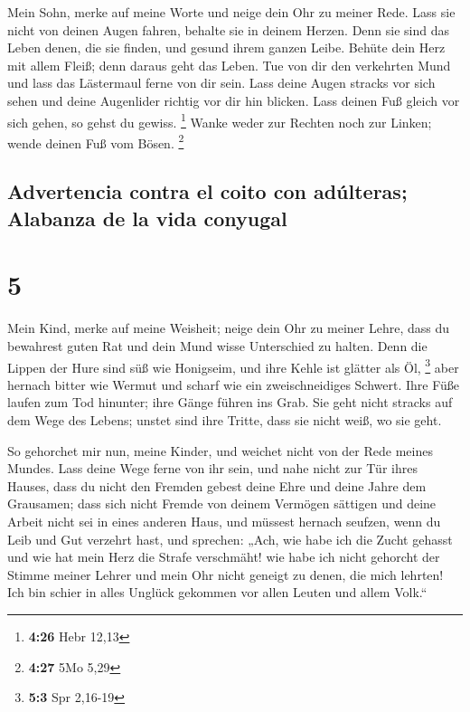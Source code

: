  Mein Sohn, merke auf meine Worte und neige dein Ohr zu
meiner Rede.  Lass sie nicht von deinen Augen fahren,
behalte sie in deinem Herzen.  Denn sie sind das Leben
denen, die sie finden, und gesund ihrem ganzen Leibe. 
Behüte dein Herz mit allem Fleiß; denn daraus geht das Leben.
 Tue von dir den verkehrten Mund und lass das Lästermaul
ferne von dir sein.  Lass deine Augen stracks vor sich
sehen und deine Augenlider richtig vor dir hin blicken. 
Lass deinen Fuß gleich vor sich gehen, so gehst du gewiss. \footnote{\textbf{4:26}
  Hebr 12,13}  Wanke weder zur Rechten noch zur Linken;
wende deinen Fuß vom Bösen. \footnote{\textbf{4:27} 5Mo 5,29}

\hypertarget{advertencia-contra-el-coito-con-aduxfalteras-alabanza-de-la-vida-conyugal}{%
\subsection{Advertencia contra el coito con adúlteras; Alabanza de la
vida
conyugal}\label{advertencia-contra-el-coito-con-aduxfalteras-alabanza-de-la-vida-conyugal}}

\hypertarget{section-4}{%
\section{5}\label{section-4}}

 Mein Kind, merke auf meine Weisheit; neige dein Ohr zu
meiner Lehre,  dass du bewahrest guten Rat und dein Mund
wisse Unterschied zu halten.  Denn die Lippen der Hure
sind süß wie Honigseim, und ihre Kehle ist glätter als Öl, \footnote{\textbf{5:3}
  Spr 2,16-19}  aber hernach bitter wie Wermut und scharf
wie ein zweischneidiges Schwert.  Ihre Füße laufen zum Tod
hinunter; ihre Gänge führen ins Grab.  Sie geht nicht
stracks auf dem Wege des Lebens; unstet sind ihre Tritte, dass sie nicht
weiß, wo sie geht.

 So gehorchet mir nun, meine Kinder, und weichet nicht von
der Rede meines Mundes.  Lass deine Wege ferne von ihr
sein, und nahe nicht zur Tür ihres Hauses,  dass du nicht
den Fremden gebest deine Ehre und deine Jahre dem Grausamen;
 dass sich nicht Fremde von deinem Vermögen sättigen und
deine Arbeit nicht sei in eines anderen Haus,  und
müssest hernach seufzen, wenn du Leib und Gut verzehrt hast,
 und sprechen: „Ach, wie habe ich die Zucht gehasst und
wie hat mein Herz die Strafe verschmäht!  wie habe ich
nicht gehorcht der Stimme meiner Lehrer und mein Ohr nicht geneigt zu
denen, die mich lehrten!  Ich bin schier in alles Unglück
gekommen vor allen Leuten und allem Volk.``

